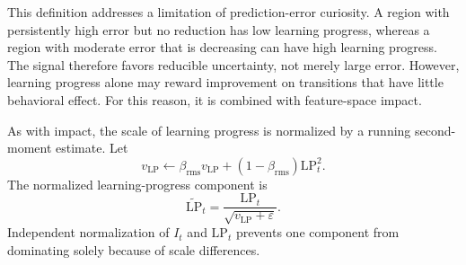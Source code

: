 This definition addresses a limitation of prediction-error curiosity.
A region with persistently high error but no reduction has low learning progress, whereas a region with moderate error that is decreasing can have high learning progress.
The signal therefore favors reducible uncertainty, not merely large error.
However, learning progress alone may reward improvement on transitions that have little behavioral effect.
For this reason, it is combined with feature-space impact.

As with impact, the scale of learning progress is normalized by a running second-moment estimate.
Let
\begin{equation}
    v_{\mathrm{LP}} \leftarrow
    \beta_{\mathrm{rms}}v_{\mathrm{LP}}
    +(1-\beta_{\mathrm{rms}})\mathrm{LP}_t^2.
\end{equation}
The normalized learning-progress component is
\begin{equation}
    \widetilde{\mathrm{LP}}_t
    =\frac{\mathrm{LP}_t}{\sqrt{v_{\mathrm{LP}}+\varepsilon}}.
\end{equation}
Independent normalization of $I_t$ and $\mathrm{LP}_t$ prevents one component from dominating solely because of scale differences.